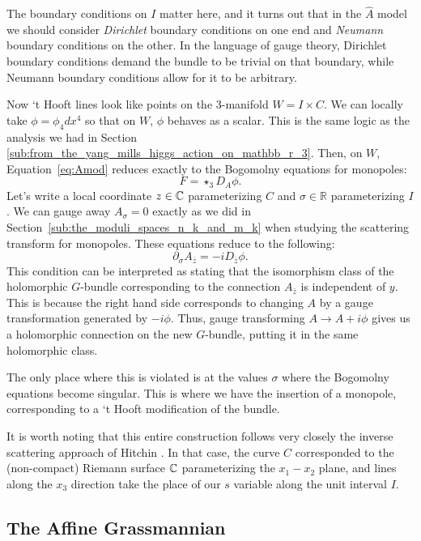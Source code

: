 	The boundary conditions on $I$ matter here, and it turns out that in the $\hat A$ model we should consider \emph{Dirichlet} boundary conditions on one end and \emph{Neumann} boundary conditions on the other. In the language of gauge theory, Dirichlet boundary conditions demand the bundle to be trivial on that boundary, while Neumann boundary conditions allow for it to be arbitrary.
	
	Now `t Hooft lines look like points on the 3-manifold $W = I \times C$. We can locally take $\phi = \phi_4 dx^4$ so that on $W$, $\phi$ behaves as a scalar. This is the same logic as the analysis we had in Section \ref{sub:from_the_yang_mills_higgs_action_on_mathbb_r_3}.
	Then, on $W$, Equation~\eqref{eq:Amod} reduces exactly to the Bogomolny equations for monopoles:
	\[
		F = \star_3 D_A \phi.
	\]
	Let's write a local coordinate $z \in \mathbb{C}$ parameterizing $C$ and $\sigma \in \mathbb R$ parameterizing $I$.
	We can gauge away $A_\sigma = 0$ exactly as we did in Section~\ref{sub:the_moduli_spaces_n_k_and_m_k} when studying the scattering transform for monopoles. These equations reduce to the following:
	\[
		\partial_\sigma A_{\overline z} = - i D_{\overline z} \phi.
	\]
	This condition can be interpreted as stating that the isomorphism class of the holomorphic $G$-bundle corresponding to the connection $A_{\overline z}$ is independent of $y$. This is because the right hand side corresponds to changing $A$ by a gauge transformation generated by $-i \phi$. Thus, gauge transforming $A \to A + i \phi$ gives us a holomorphic connection on the new $G$-bundle, putting it in the same holomorphic class.
	
	 The only place where this is violated is at the values $\sigma$ where the Bogomolny equations become singular. This is where we have the insertion of a monopole, corresponding to a `t Hooft modification of the bundle. 
	 
	 It is worth noting that this entire construction follows very closely the inverse scattering approach of Hitchin \cite{hitchin1982, atiyahhitchin1988}. In that case, the curve $C$ corresponded to the (non-compact) Riemann surface $\mathbb{C}$ parameterizing the $x_1-x_2$ plane, and lines along the $x_3$ direction take the place of our $s$ variable along the unit interval $I$.
	
	\subsection{The Affine Grassmannian}
	
